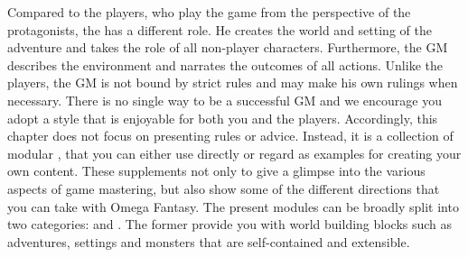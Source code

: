 %
%
Compared to the players, who play the game from the perspective of the protagonists, the  has a different role.
He creates the world and setting of the adventure and takes the role of all non-player characters.
Furthermore, the GM describes the environment and narrates the outcomes of all actions. 
Unlike the players, the GM is not bound by strict rules and may make his own rulings when necessary.
There is no single way to be a successful GM and we encourage you adopt a style that is enjoyable for both you and the players.
%
\vfill
%
Accordingly, this chapter does not focus on presenting rules or advice.
Instead, it is a collection of modular , that you can either use directly or regard as examples for creating your own content.
These supplements not only to give a glimpse into the various aspects of game mastering, but also show some of the different directions that you can take with Omega Fantasy. 
The present modules can be broadly split into two categories:  and .
The former provide you with world building blocks such as adventures, settings and monsters that are self-contained and extensible.
